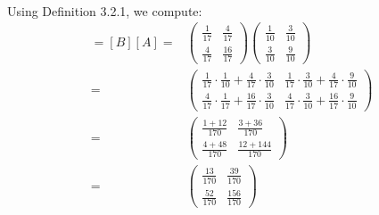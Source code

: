 \documentclass[12pt]{article}
\newenvironment{problem}[2][Problem]
{
	\begin{trivlist} 
		\item[\hskip \labelsep {\bfseries #1 #2:}]
	}
{
	\end{trivlist}
	}
\newenvironment{solution}[1][Solution]
{
	\begin{trivlist} 
		\item[\hskip \labelsep {\itshape #1:}]
	}
	{
	\end{trivlist}
}
\begin{document}
\begin{problem}{1}
\begin{solution}
\begin{align*}
\end{align*}
Using Definition 3.2.1, we compute:
\begin{align*}
[T]=[B][A]=&\begin{pmatrix} \frac{1}{17} & \frac{4}{17} \\ \frac{4}{17} & \frac{16}{17} \end{pmatrix}\begin{pmatrix} \frac{1}{10} & \frac{3}{10} \\ \frac{3}{10} & \frac{9}{10} \end{pmatrix}\\
=&\begin{pmatrix} \frac{1}{17} \cdot \frac{1}{10} +  \frac{4}{17} \cdot \frac{3}{10} &  \frac{1}{17} \cdot \frac{3}{10} + \frac{4}{17} \cdot \frac{9}{10} \\ \frac{4}{17}\cdot \frac{1}{17} + \frac{16}{17}\cdot \frac{3}{10} & \frac{4}{17}\cdot \frac{3}{10} + \frac{16}{17}\cdot \frac{9}{10}\end{pmatrix} \\
=& \begin{pmatrix} \frac{1+12}{170} &  \frac{3+36}{170} \\ \frac{4+48}{170} & \frac{12+144}{170}\end{pmatrix} \\
=& \begin{pmatrix} \frac{13}{170} & \frac{39}{170} \\ \frac{52}{170} & \frac{156}{170} \end{pmatrix}

\end{align*}
\end{solution}
\end{problem}
\end{document}
